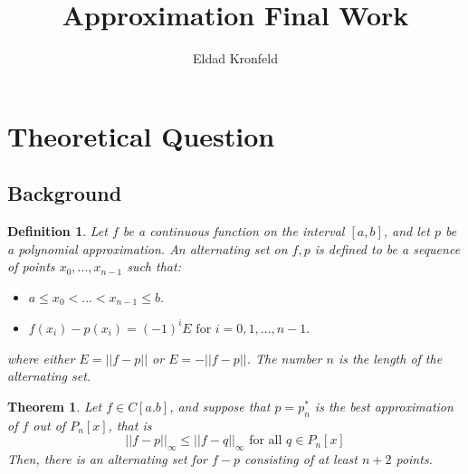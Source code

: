 \documentclass[]{article}
\title{Approximation Final Work}
\author{Eldad Kronfeld}
\date{}
\newtheorem{thm}{Theorem}[section]
\newtheorem{definition}{Definition}[]
\begin{document}
\maketitle
\tableofcontents

\newpage
\section{Theoretical Question }
\subsection{Background}
\begin{definition}
	\label{definition1}
	Let $f$ be a continuous function on the interval $[a, b]$, and let $p$ be a polynomial approximation. An alternating set on $f, p$ is defined to be a sequence of points $x_{0}, ..., x_{n-1}$ such that:
	\begin{itemize}
	\item $a \leq x_0 <...<x_{n - 1}\leq b .$
	\item $f(x_i) - p(x_i) = (-1)^i E \text{ for } i=0,1,...,n-1.$ 
\end{itemize}
where either $E=||f-p||$ or $E=-||f-p||$. The number $n$ is the length of the alternating set.
\end{definition}


\begin{thm}
	\label{thm1}
	Let $f \in C[a.b]$, and suppose that $p=p^{*}_{n}$ is the best approximation of $f$ out of $P_{n}[x]$, that is
	\begin{equation}
		||f-p||_{\infty} \le ||f-q||_{\infty} \text{ for all } q\in P_{n}[x] 
	\end{equation}
	Then, there is an alternating set for $f-p$ consisting of at least $n+2$  points.
	
\end{thm}
\end{document}
